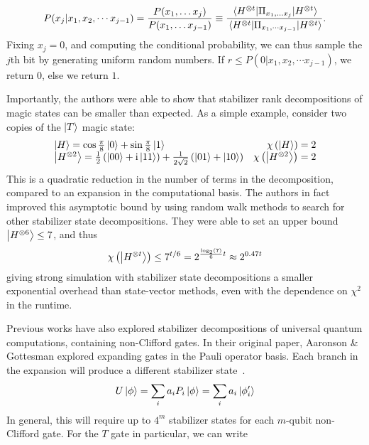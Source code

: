 \begin{equation}
    P(x_{j}\vert x_{1},x_{2},\cdots x_{j-1}) = \frac{P(x_{1},\dots x_{j})}{P(x_{1},\dots x_{j-1})} \equiv \frac{\matrixel{H^{\otimes t}}{\Pi_{x_{1},\dots x_{j}}}{H^{\otimes t}}}{\matrixel{H^{\otimes t}}{\Pi_{x_{1},\cdots x_{j-1}}}{H^{\otimes t}}}.
\label{eq:pbc_sampling}
\end{equation}
Fixing $x_{j}=0$, and computing the conditional probability, we can thus sample the $j$th bit by generating uniform random numbers. If $r\leq P(0\vert x_{1},x_{2},\cdots x_{j-1})$, we return $0$, else we return $1$.\par
Importantly, the authors were able to show that stabilizer rank decompositions of magic states can be smaller than expected. As a simple example, consider two copies of the $\ket{T}$ magic state:
\begin{equation}
\begin{array}{l r}
\ket{H} = \cos{\frac{\pi}{8}}\ket{0}+\sin{\frac{\pi}{8}}\ket{1}& \chi\left(\ket{H}\right)=2\\
\ket{H^{\otimes 2}} = \frac{1}{2}\left(\ket{00}+\mathrm{i}\ket{11}\right) + \frac{1}{2\sqrt{2}}\left(\ket{01}+\ket{10}\right) & \chi\left(\ket{H^{\otimes 2}}\right) = 2
\end{array}
\end{equation}
This is a quadratic reduction in the number of terms in the decomposition, compared to an expansion in the computational basis. The authors in fact improved this asymptotic bound by using random walk methods to search for other stabilizer state decompositions. They were able to set an upper bound $\ket{H^{\otimes 6}}\leq 7$, and thus
\begin{equation}
\chi\left(\ket{H^{\otimes t}}\right) \leq 7^{t/6}=2^{\frac{\log_{2}(7)}{6}t}\approx 2^{0.47 t}
\label{eq:exact_t_state_bound}
\end{equation}
giving strong simulation with stabilizer state decompositions a smaller exponential overhead than state-vector methods, even with the dependence on $\chi^{2}$ in the runtime.\par
Previous works have also explored stabilizer decompositions of universal quantum computations, containing non-Clifford gates. In their original paper, Aaronson \& Gottesman explored expanding gates in the Pauli operator basis. Each branch in the expansion will produce a different stabilizer state~\cite{Aaronson2004}.
\[U\ket{\phi} = \sum_{i}a_{i}P_{i}\ket{\phi} = \sum_{i}a_{i}\ket{\phi'_{i}}\]
In general, this will require up to $4^{m}$ stabilizer states for each $m$-qubit non-Clifford gate. For the $T$ gate in particular, we can write
